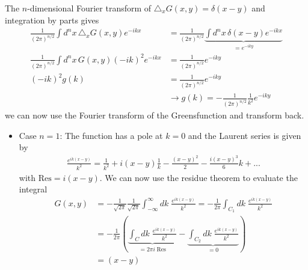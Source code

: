 \documentclass[10pt,a4paper]{article}
\theoremstyle{definition}
\begin{document}
    The $n$-dimensional Fourier transform of $\triangle_x G(x,y) = \delta(x-y)$ and integration by parts gives
    \begin{align}
        \frac{1}{(2\pi)^{n/2}}\int d^nx\,\triangle_x G(x,y) e^{-ikx}&=\frac{1}{(2\pi)^{n/2}}\underbrace{\int d^nx\,\delta(x-y) e^{-ikx}}_{=e^{-iky}}\\
        \frac{1}{(2\pi)^{n/2}}\int d^nx\, G(x,y) (-ik)^2 e^{-ikx}&=\frac{1}{(2\pi)^{n/2}}e^{-iky}\\
        (-ik)^2g(k)&=\frac{1}{(2\pi)^{n/2}}e^{-iky}\\
        &\rightarrow g(k)=-\frac{1}{(2\pi)^{n/2}}\frac{1}{k^2}e^{-iky}
    \end{align}
    we can now use the Fourier transform of the Greensfunction and transform back.
    \begin{itemize}
        \item Case $n=1$: The function has a pole at $k=0$ and the Laurent series is given by
        \begin{align}
            \frac{e^{ik(x-y)}}{k^2}=\frac{1}{k^2}+i(x-y)\frac{1}{k}-\frac{(x-y)^2}{2}-\frac{i(x-y)^3}{6} k + ...
        \end{align}
        with $\text{Res}=i(x-y)$. We can now use the residue theorem to evaluate the integral
        \begin{align}
            G(x,y)&=-\frac{1}{\sqrt{2\pi}}\frac{1}{\sqrt{2\pi}}\int_{-\infty}^\infty dk\; \frac{e^{ik(x-y)}}{k^2}=-\frac{1}{2\pi}\int_{C_1} dk\; \frac{e^{ik(x-y)}}{k^2}\\
            &=-\frac{1}{2\pi}\left(\underbrace{\int_C dk\; \frac{e^{ik(x-y)}}{k^2}}_{=2\pi i\;\text{Res}} - \underbrace{\int_{C_2} dk\; \frac{e^{ik(x-y)}}{k^2}}_{=0}\right)\\
            &=(x-y)
        \end{align}
    
        \begin{center}
\end{center}
\end{itemize}
\end{document}
